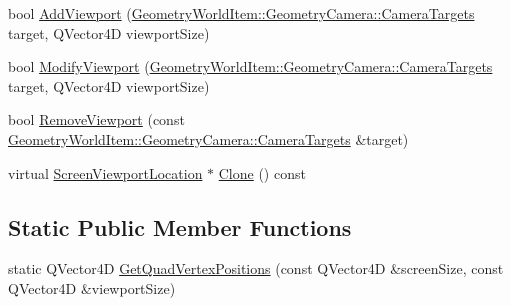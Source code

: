 \begin{DoxyCompactItemize}
bool \mbox{\hyperlink{class_geometry_engine_1_1_geometry_render_step_1_1_screen_viewport_location_aafca840a5b85f1c8b3fd13603f610682}{Add\+Viewport}} (\mbox{\hyperlink{namespace_geometry_engine_1_1_geometry_world_item_1_1_geometry_camera_a3766848bae97ff8203fa26907ac359ef}{Geometry\+World\+Item\+::\+Geometry\+Camera\+::\+Camera\+Targets}} target, Q\+Vector4D viewport\+Size)
\item 
bool \mbox{\hyperlink{class_geometry_engine_1_1_geometry_render_step_1_1_screen_viewport_location_aa9a8f050c01fbc418281534b9c3dce61}{Modify\+Viewport}} (\mbox{\hyperlink{namespace_geometry_engine_1_1_geometry_world_item_1_1_geometry_camera_a3766848bae97ff8203fa26907ac359ef}{Geometry\+World\+Item\+::\+Geometry\+Camera\+::\+Camera\+Targets}} target, Q\+Vector4D viewport\+Size)
\item 
bool \mbox{\hyperlink{class_geometry_engine_1_1_geometry_render_step_1_1_screen_viewport_location_a25556391a278bde524476a682772541e}{Remove\+Viewport}} (const \mbox{\hyperlink{namespace_geometry_engine_1_1_geometry_world_item_1_1_geometry_camera_a3766848bae97ff8203fa26907ac359ef}{Geometry\+World\+Item\+::\+Geometry\+Camera\+::\+Camera\+Targets}} \&target)
\item 
virtual \mbox{\hyperlink{class_geometry_engine_1_1_geometry_render_step_1_1_screen_viewport_location}{Screen\+Viewport\+Location}} $\ast$ \mbox{\hyperlink{class_geometry_engine_1_1_geometry_render_step_1_1_screen_viewport_location_a95ff121d95a2c4f20d0994aa7ccdab6a}{Clone}} () const
\end{DoxyCompactItemize}
\subsection*{Static Public Member Functions}
\begin{DoxyCompactItemize}
\item 
static Q\+Vector4D \mbox{\hyperlink{class_geometry_engine_1_1_geometry_render_step_1_1_screen_viewport_location_a2a958b2908d7e778f9e692cbe7dd9863}{Get\+Quad\+Vertex\+Positions}} (const Q\+Vector4D \&screen\+Size, const Q\+Vector4D \&viewport\+Size)
\end{DoxyCompactItemize}
